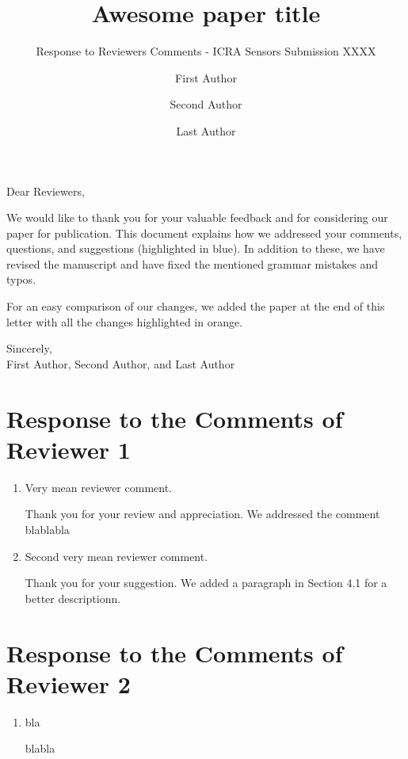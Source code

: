 \documentclass[a4paper]{scrartcl}
\title{Awesome paper title}
\subtitle{Response to Reviewers Comments - ICRA Sensors Submission XXXX}
\author{First Author \and Second Author \and Last Author}
\newenvironment{rebuttal}{\begin{enumerate}[label={\color{grey}\thesection.\arabic{enumi}},leftmargin=0pt,ref=\thesection.\arabic{enumi}]}{\end{enumerate}}
\newcommand{\reviewtext}[1]{{\color{kitblueex} #1}}
\newcommand{\reviewchanges}[1]{{\color{orange} #1}} %
\begin{document}
\maketitle

Dear Reviewers,

We would like to thank you for your valuable feedback and for considering our paper for publication. 
%
This document explains how we addressed your comments, questions, and suggestions (highlighted in \reviewtext{blue}).
%
In addition to these, we have revised the manuscript and have fixed the mentioned grammar mistakes and typos.

For an easy comparison of our changes, we added the paper at the end of this letter with all the changes highlighted in \reviewchanges{orange}.

Sincerely,\\
First Author, Second Author, and Last Author

\section*{Response to the Comments of Reviewer 1}
\addtocounter{section}{1}

\begin{rebuttal}
\item \reviewtext{Very mean reviewer comment.}

Thank you for your review and appreciation. We addressed the comment blablabla

\item \reviewtext{Second very mean reviewer comment.}

Thank you for your suggestion. We added a paragraph in Section 4.1 for a better descriptionn.
\end{rebuttal}


\section*{Response to the Comments of Reviewer 2}
\addtocounter{section}{2}
\begin{rebuttal}
\item \reviewtext{bla}

blabla

\end{rebuttal}

% 
% 
\end{document}
